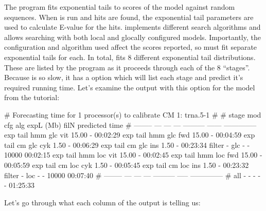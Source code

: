 The  program fits exponential tails to scores of the
model against random sequences. When  is run and hits
are found, the exponential tail parameters are used to calculate
E-value for the hits.  implements different search
algorithms and allows searching with both local and glocally
configured models. Importantly, the configuration and algorithm used
affect the scores reported, so  must fit separate
exponential tails for each.  In total,
 fits 8 different exponential tail
distributions. These are listed by the program as it proceeds through
each of the 8 ``stages''.  Because  is so slow, it
has a  option which will list each stage and predict
it's required running time. Let's examine the output with this option
for the  model from the tutorial:


\begin{sreoutput}
# Forecasting time for 1 processor(s) to calibrate CM 1: trna.5-1
#
# stage     mod  cfg  alg  expL (Mb)   filN predicted time
# --------  ---  ---  ---  --------- ------ --------------
  exp tail  hmm  glc  vit      15.00      -       00:02:29
  exp tail  hmm  glc  fwd      15.00      -       00:04:59
  exp tail   cm  glc  cyk       1.50      -       00:06:29
  exp tail   cm  glc  ins       1.50      -       00:23:34
  filter      -  glc    -          -  10000       00:02:15
  exp tail  hmm  loc  vit      15.00      -       00:02:45
  exp tail  hmm  loc  fwd      15.00      -       00:05:59
  exp tail   cm  loc  cyk       1.50      -       00:05:45
  exp tail   cm  loc  ins       1.50      -       00:23:32
  filter      -  loc    -          -  10000       00:07:40
# --------  ---  ---  ---  ---------  ----- --------------
# all         -    -    -          -      -       01:25:33
\end{sreoutput}

Let's go through what each column of the output is telling us:

